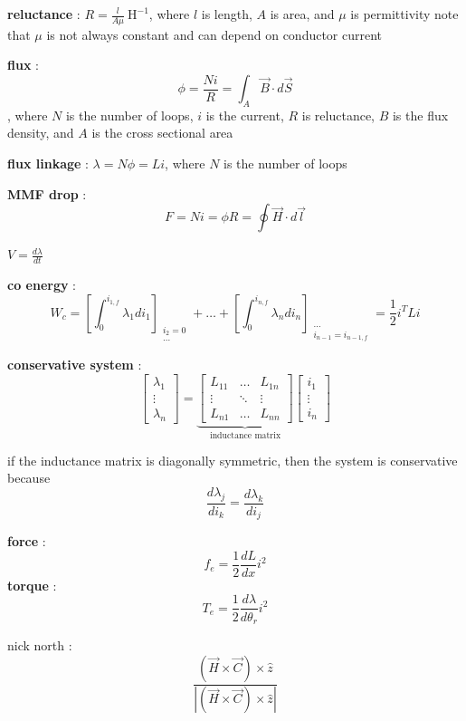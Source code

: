 \documentclass[11pt]{article}
\begin{document}
\textbf{reluctance} : \(R = \frac{l}{A \mu}\ \text{H}^{-1}\), where \(l\) is length, \(A\) is area, and \(\mu\) is permittivity
  note that \(\mu\) is not always constant and can depend on conductor current

\textbf{flux} : $$\phi = \frac{Ni}{R} = \int_A \overrightarrow{B} \cdot d \overrightarrow{S}$$, where \(N\) is the number of loops, \(i\) is the current, \(R\) is reluctance, \(B\) is the flux density, and \(A\) is the cross sectional area

\textbf{flux linkage} : \(\lambda = N \phi = Li\), where \(N\) is the number of loops

\textbf{MMF drop} : $$F = Ni = \phi R = \oint \overrightarrow{H} \cdot d \overrightarrow{l}$$

\(V = \frac{d \lambda}{dt}\)

\textbf{co energy} : $$W_c = \left[ \int_{0}^{i_{1,f}} \lambda_1 di_1 \right]_{\substack{i_2 = 0 \\ ...}} + \dots + \left[ \int_{0}^{i_{n,f}} \lambda_n di_n \right]_{\substack{\dots \\ i_{n-1} = i_{n-1,f}}} = \frac{1}{2} i^T L i$$

\textbf{conservative system} : $$\left[ \begin{matrix} \lambda_1 \\ \vdots \\ \lambda_n \end{matrix} \right] = \underbrace{\left[ \begin{matrix} L_{11} & \dots & L_{1n} \\ \vdots & \ddots & \vdots \\ L_{n1} & \dots & L_{nn} \end{matrix} \right]}_{\text{inductance matrix}} \left[ \begin{matrix} i_1 \\ \vdots \\ i_n \end{matrix} \right]$$

if the inductance matrix is diagonally symmetric, then the system is conservative because $$\frac{d \lambda_j}{d i_k} = \frac{d \lambda_k}{d i_j}$$

\textbf{force} : $$f_e = \frac{1}{2} \frac{dL}{dx} i^2$$
\textbf{torque} : $$T_e = \frac{1}{2} \frac{d \lambda}{d \theta_r} i^2$$

nick north : $$\frac{(\overrightarrow{H} \times \overrightarrow{C}) \times \hat{z}}{\left|(\overrightarrow{H} \times \overrightarrow{C}) \times \hat{z}\right|}$$
\end{document}
